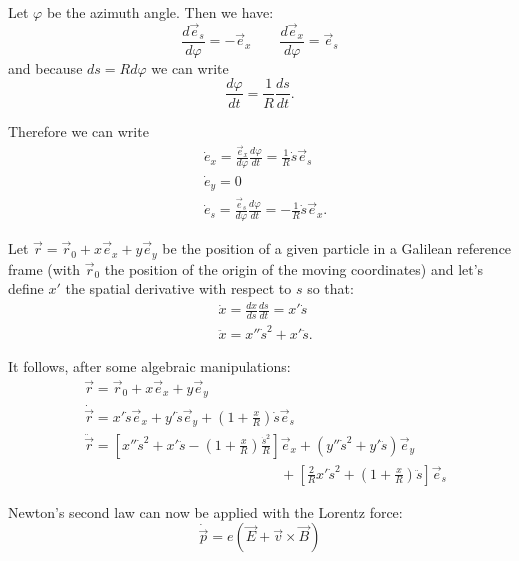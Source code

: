 Let $\varphi$ be the azimuth angle. Then we have:
\begin{equation}
\frac{d \vec{e}_s}{d \varphi} = -\vec{e}_x \qquad \frac{d \vec{e}_x}{d \varphi} = \vec{e}_s
\end{equation}
and because $ds = R d\varphi$ we can write
\begin{equation}
\frac{d \varphi}{d t}  = \frac{1}{R} \frac{d s}{d t}.
\end{equation}

Therefore we can write
\begin{align}
&\dot{e}_x = \frac{\vec{e}_x}{d \varphi}\frac{d \varphi}{dt} = \frac{1}{R} \dot{s}\vec{e}_s \nonumber \\
&\dot{e}_y = 0 \\
&\dot{e}_s = \frac{\vec{e}_s}{d \varphi}\frac{d \varphi}{dt} = -\frac{1}{R} \dot{s}\vec{e}_x \nonumber.
\end{align}

Let $\vec{r} = \vec{r}_0 + x\vec{e}_x + y \vec{e}_y$ be the position of a given particle in a Galilean reference frame (with $\vec{r}_0$ the position of the origin of the moving coordinates) and let's define $x'$ the spatial derivative with respect to $s$ so that:
\begin{align}
&\dot{x}= \frac{dx}{ds}\frac{ds}{dt} = x'\dot{s} \nonumber \\
&\ddot{x}= x''\dot{s}^2+x'\ddot{s}.
\end{align}

It follows, after some algebraic manipulations:
\begin{align}
&\vec{r} = \vec{r}_0 + x\vec{e}_x + y \vec{e}_y \nonumber \\
&\dot{\vec{r}}= x' \dot{s} \vec{e}_x + y'\dot{s} \vec{e}_y  + \left(1+\frac{x}{R}\right)\dot{s}\vec{e}_s\\
&\ddot{\vec{r}}= \left[x'' \dot{s}^2 + x' \ddot{s} - \left( 1+\frac{x}{R} \right)\frac{\dot{s}^2}{R}\right] \vec{e}_x + (y''\dot{s}^2 + y'\ddot{s}) \vec{e}_y \nonumber \\
& \hspace{14em} + \left[\frac{2}{R}x'\dot{s}^2 +\left(1+\frac{x}{R}\right)\ddot{s}\right]\vec{e}_s \nonumber
\end{align}

Newton's second law can now be applied with the Lorentz force:
\begin{equation}
\dot{\vec{p}} = e(\vec{E}+\vec{v} \times \vec{B}) 
\end{equation}

